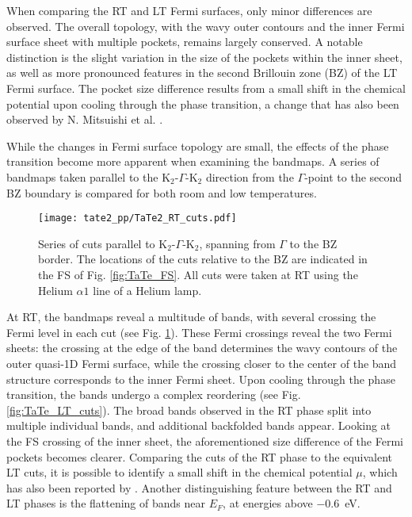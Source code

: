 When comparing the RT and LT Fermi surfaces, only minor differences are observed.
The overall topology, with the wavy outer contours and the inner Fermi surface sheet with multiple pockets, remains largely conserved.
A notable distinction is the slight variation in the size of the pockets within the inner sheet, as well as more pronounced features in the second Brillouin zone (BZ) of the LT Fermi surface.
The pocket size difference results from a small shift in the chemical potential upon cooling through the phase transition, a change that has also been observed by N. Mitsuishi et al. \cite{mitsuishi_unveiling_2024}.

While the changes in Fermi surface topology are small, the effects of the phase transition become more apparent when examining the bandmaps.
A series of bandmaps taken parallel to the K$_2$-$\Gamma$-K$_2$ direction from the $\Gamma$-point to the second BZ boundary is compared for both room and low temperatures.

\begin{figure}[t!]
	\centering
	\texttt{[image: tate2\_pp/TaTe2\_RT\_cuts.pdf]}
	\caption{Series of cuts parallel to K$_2$-$\Gamma$-K$_2$, spanning from $\Gamma$ to the BZ border. The locations of the cuts relative to the BZ are indicated in the FS of Fig. \ref{fig:TaTe_FS}. All cuts were taken at RT using the Helium $\alpha1$ line of a Helium lamp.}
	\label{fig:TaTe_RT_cuts}
\end{figure}

At RT, the bandmaps reveal a multitude of bands, with several crossing the Fermi level in each cut (see Fig. \ref{fig:TaTe_RT_cuts}).
These Fermi crossings reveal the two Fermi sheets: the crossing at the edge of the band determines the wavy contours of the outer quasi-1D Fermi surface, while the crossing closer to the center of the band structure corresponds to the inner Fermi sheet.
Upon cooling through the phase transition, the bands undergo a complex reordering (see Fig. \ref{fig:TaTe_LT_cuts}).
The broad bands observed in the RT phase split into multiple individual bands, and additional backfolded bands appear.
Looking at the FS crossing of the inner sheet, the aforementioned size difference of the Fermi pockets becomes clearer.
Comparing the cuts of the RT phase to the equivalent LT cuts, it is possible to identify a small shift in the chemical potential $\mu$, which has also been reported by \cite{mitsuishi_unveiling_2024}.
Another distinguishing feature between the RT and LT phases is the flattening of bands near $E_F$, at energies above \qty{-0.6}{\electronvolt}.

